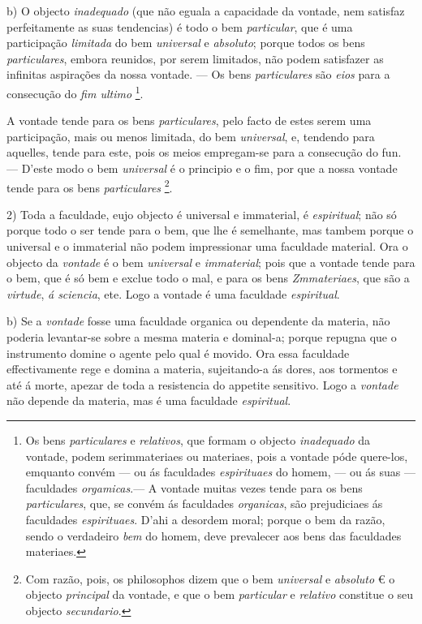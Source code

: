 b) O objecto \emph{inadequado} (que não eguala a capacidade da vontade, nem satisfaz perfeitamente as suas tendencias) é todo o bem \emph{particular}, que é uma participação \emph{limitada} do bem \emph{universal} e \emph{absoluto}; porque todos os bens \emph{particulares}, embora reunidos, por serem limitados, não podem satisfazer as infinitas   aspirações da nossa vontade. --- Os bens \emph{particulares} são \emph{eios} para a consecução do \emph{fim ultimo} \footnote{Os bens \emph{particulares} e \emph{relativos}, que formam o objecto \emph{inadequado} da vontade, podem serimmateriaes ou materiaes, pois a vontade póde quere-los, emquanto convém --- ou ás faculdades \emph{espirituaes} do homem, --- ou ás suas --- faculdades \emph{orgamicas}.--- A vontade muitas vezes tende para os bens \emph{particulares}, que, se convém ás faculdades \emph{organicas}, são prejudiciaes ás faculdades \emph{espirituaes}. D'ahi a desordem moral; porque o bem da razão, sendo o verdadeiro \emph{bem} do homem, deve prevalecer aos bens das faculdades materiaes.}.

A vontade tende para os bens \emph{particulares}, pelo facto de estes serem uma participação, mais ou menos limitada, do bem \emph{universal}, e, tendendo para aquelles, tende para este, pois os meios empregam-se para a consecução do fun. --- D'este modo o bem \emph{universal} é o principio e o fim, por que a nossa vontade tende para os bens \emph{particulares} \footnote{Com razão, pois, os philosophos dizem que o bem \emph{universal} e \emph{absoluto} € o objecto \emph{principal} da vontade, e que o bem \emph{particular} e \emph{relativo} constitue o seu objecto \emph{secundario}.}.



2) Toda a faculdade, eujo objecto é universal e immaterial, é \emph{espiritual}; não só porque todo o ser tende para o bem, que lhe é semelhante, mas tambem porque o universal e o immaterial não podem impressionar uma faculdade material. Ora o objecto da \emph{vontade} é o bem \emph{universal} e \emph{immaterial}; pois que a vontade tende para o bem, que é só bem e exclue todo o mal, e para os bens \emph{Zmmateriaes}, que são a \emph{virtude}, \emph{á sciencia}, ete. Logo a vontade é uma faculdade \emph{espiritual}.

b) Se a \emph{vontade} fosse uma faculdade organica ou dependente da materia, não poderia levantar-se sobre a mesma materia e dominal-a; porque repugna que o instrumento domine o agente pelo qual é movido. Ora essa faculdade effectivamente rege e domina a materia, sujeitando-a ás dores, aos tormentos e até á morte, apezar de toda a resistencia do appetite sensitivo. Logo a \emph{vontade} não depende da materia, mas é uma faculdade \emph{espiritual}.

